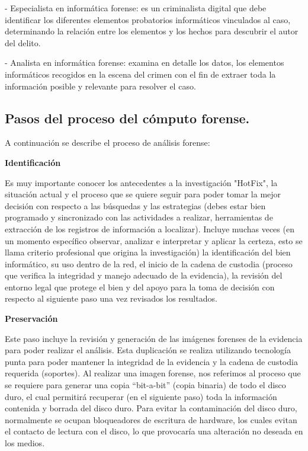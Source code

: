 - Especialista en informática forense: es un criminalista digital que debe identificar los diferentes elementos probatorios informáticos vinculados al caso, determinando la relación entre los elementos y los hechos para descubrir el autor del delito.

- Analista en informática forense: examina en detalle los datos, los elementos informáticos recogidos en la escena del crimen con el fin de extraer toda la información posible y relevante para resolver el caso.


\subsection{Pasos del proceso del cómputo forense.}

A continuación se describe el proceso de análisis forense:

\textbf{Identificación}

Es muy importante conocer los antecedentes a la investigación "HotFix", la situación actual y el proceso que se quiere seguir para poder tomar la mejor decisión con respecto a las búsquedas y las estrategias (debes estar bien programado y sincronizado con las actividades a realizar, herramientas de extracción de los registros de información a localizar). Incluye muchas veces (en un momento específico observar, analizar e interpretar y aplicar la certeza, esto se llama criterio profesional que origina la investigación) la identificación del bien informático, su uso dentro de la red, el inicio de la cadena de custodia (proceso que verifica la integridad y manejo adecuado de la evidencia), la revisión del entorno legal que protege el bien y del apoyo para la toma de decisión con respecto al siguiente paso una vez revisados los resultados.

\textbf{Preservación}

Este paso incluye la revisión y generación de las imágenes forenses de la evidencia para poder realizar el análisis. Esta duplicación se realiza utilizando tecnología punta para poder mantener la integridad de la evidencia y la cadena de custodia requerida (soportes). Al realizar una imagen forense, nos referimos al proceso que se requiere para generar una copia “bit-a-bit” (copia binaria) de todo el disco duro, el cual permitirá recuperar (en el siguiente paso) toda la información contenida y borrada del disco duro. Para evitar la contaminación del disco duro, normalmente se ocupan bloqueadores de escritura de hardware, los cuales evitan el contacto de lectura con el disco, lo que provocaría una alteración no deseada en los medios.

